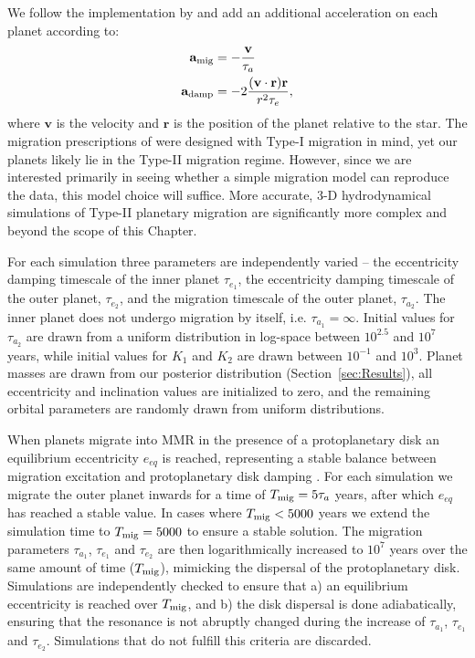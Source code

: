 We follow the implementation by \cite{Papaloizou2000} and add an additional acceleration on each planet according to:
\begin{align*}
\begin{split}
\textbf{a}_{\rm mig} &=  -\frac{\textbf{v}}{\tau_a} \\
\textbf{a}_{\rm damp} &= -2\frac{(\textbf{v}\cdot\textbf{r})\textbf{r}}{r^2\tau_e},
\end{split}
\end{align*}
where $\textbf{v}$ is the velocity and $\textbf{r}$ is the position of the planet relative to the star. 
The migration prescriptions of \citet{Papaloizou2000} were designed with Type-I migration in mind, yet our planets likely lie in the Type-II migration regime.
However, since we are interested primarily in seeing whether a simple migration model can reproduce the data, this model choice will suffice. 
More accurate, 3-D hydrodynamical simulations of Type-II planetary migration are significantly more complex and beyond the scope of this Chapter. 

For each simulation three parameters are independently varied -- the eccentricity damping timescale of the inner planet $\tau_{e_1}$, the eccentricity damping timescale of the outer planet, $\tau_{e_2}$, and the migration timescale of the outer planet, $\tau_{a_2}$.
The inner planet does not undergo migration by itself, i.e. $\tau_{a_1} = \infty$.
Initial values for $\tau_{a_2}$ are drawn from a uniform distribution in log-space between $10^{2.5}$ and $10^7$ years, while initial values for $K_1$ and $K_2$ are drawn between $10^{-1}$ and $10^3$.
Planet masses are drawn from our posterior distribution (Section~\ref{sec:Results}), all eccentricity and inclination values are initialized to zero, and the remaining orbital parameters are randomly drawn from uniform distributions. 

When planets migrate into MMR in the presence of a protoplanetary disk an equilibrium eccentricity $e_{eq}$ is reached, representing a stable balance between migration excitation and protoplanetary disk damping \citep[e.g.][]{Goldreich2014}. 
For each simulation we migrate the outer planet inwards for a time of $T_{\rm mig} = 5\tau_a$ years, after which $e_{eq}$ has reached a stable value. 
In cases where $T_{\rm mig} < 5000$ years we extend the simulation time to $T_{\rm mig} = 5000$ to ensure a stable solution. 
The migration parameters $\tau_{a_1}$, $\tau_{e_1}$ and $\tau_{e_2}$ are then logarithmically increased to $10^7$ years over the same amount of time ($T_{\rm mig}$), mimicking the dispersal of the protoplanetary disk. 
Simulations are independently checked to ensure that a) an equilibrium eccentricity is reached over $T_{\rm mig}$, and b) the disk dispersal is done adiabatically, ensuring that the resonance is not abruptly changed during the increase of $\tau_{a_1}$, $\tau_{e_1}$ and $\tau_{e_2}$.
Simulations that do not fulfill this criteria are discarded.

